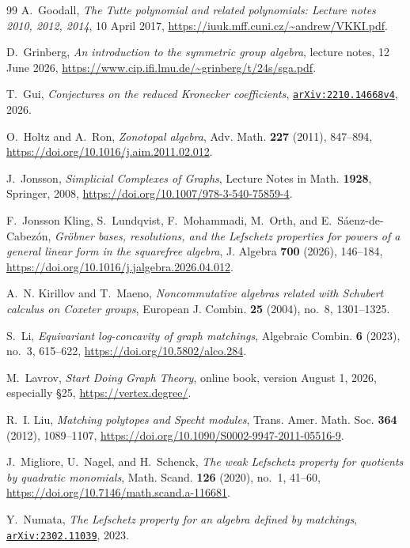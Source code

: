 \documentclass[12pt]{amsart}
\theoremstyle{definition}
\theoremstyle{remark}
\newcommand\arxiv[1]{\href{https://arxiv.org/abs/#1}{\texttt{arXiv:#1}}}
\begin{document}
\begin{thebibliography}{99}
A.~Goodall,
\emph{The Tutte polynomial and related polynomials:
Lecture notes 2010, 2012, 2014},
10 April 2017,
\url{https://iuuk.mff.cuni.cz/~andrew/VKKI.pdf}.

D.~Grinberg,
\emph{An introduction to the symmetric group algebra},
lecture notes,
12 June 2026,
\url{https://www.cip.ifi.lmu.de/~grinberg/t/24s/sga.pdf}.

T.~Gui,
\emph{Conjectures on the reduced Kronecker coefficients},
\arxiv{2210.14668v4}, 2026.

O.~Holtz and A.~Ron,
\emph{Zonotopal algebra},
Adv. Math. \textbf{227} (2011), 847--894,
\url{https://doi.org/10.1016/j.aim.2011.02.012}.

J.~Jonsson,
\emph{Simplicial Complexes of Graphs},
Lecture Notes in Math. \textbf{1928}, Springer, 2008,
\url{https://doi.org/10.1007/978-3-540-75859-4}.

F.~Jonsson Kling, S.~Lundqvist, F.~Mohammadi, M.~Orth, and
E.~S\'{a}enz-de-Cabez\'{o}n,
\emph{Gr\"obner bases, resolutions, and the Lefschetz properties for powers
of a general linear form in the squarefree algebra},
J. Algebra \textbf{700} (2026), 146--184,
\url{https://doi.org/10.1016/j.jalgebra.2026.04.012}.

A.~N. Kirillov and T.~Maeno,
\emph{Noncommutative algebras related with Schubert calculus on Coxeter groups},
European J. Combin. \textbf{25} (2004), no.~8, 1301--1325.

S.~Li,
\emph{Equivariant log-concavity of graph matchings},
Algebraic Combin. \textbf{6} (2023), no.~3, 615--622,
\url{https://doi.org/10.5802/alco.284}.

M.~Lavrov,
\emph{Start Doing Graph Theory},
online book, version August 1, 2026, especially \S25,
\url{https://vertex.degree/}.

R.~I. Liu,
\emph{Matching polytopes and Specht modules},
Trans. Amer. Math. Soc. \textbf{364} (2012), 1089--1107,
\url{https://doi.org/10.1090/S0002-9947-2011-05516-9}.

J.~Migliore, U.~Nagel, and H.~Schenck,
\emph{The weak Lefschetz property for quotients by quadratic monomials},
Math. Scand. \textbf{126} (2020), no.~1, 41--60,
\url{https://doi.org/10.7146/math.scand.a-116681}.

Y.~Numata,
\emph{The Lefschetz property for an algebra defined by matchings},
\arxiv{2302.11039}, 2023.


\end{thebibliography}
\end{document}
